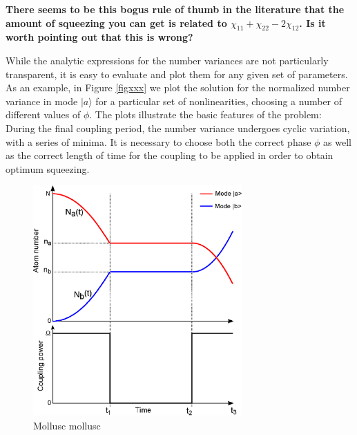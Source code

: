 \documentclass[12pt]{iopart}
\begin{document}
{\bf{There seems to be this bogus rule of thumb in the literature that the amount of squeezing you can get is related to $\chi_{11}+\chi_{22}-2\chi_{12}$. Is it worth pointing out that this is wrong?}}

While the analytic expressions for the number variances are not particularly transparent, it is easy to evaluate and plot them for any given set of parameters. As an example, in Figure \ref{figxxx} we plot the solution for the normalized number variance in mode $|a\rangle$ for a particular set of nonlinearities, choosing a number of different values of $\phi$. The plots illustrate the basic features of the problem: During the final coupling period, the number variance undergoes cyclic variation, with a series of minima. It is necessary to choose both the correct phase $\phi$ as well as the correct length of time for the coupling to be applied in order to obtain optimum squeezing.







\begin{figure}
    \centering
    \includegraphics[width=8cm]{figures/pulse_scheme.eps}
    \caption{Mollusc mollusc}
    \label{figPulseScheme}
\end{figure}
\end{document}
